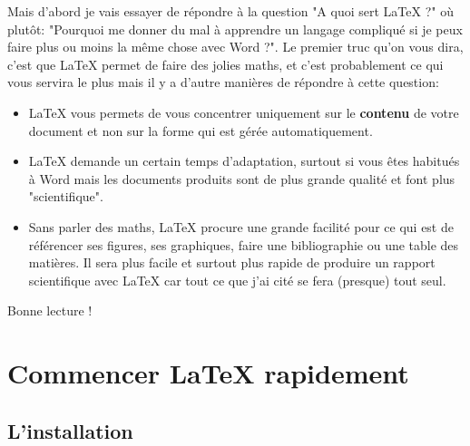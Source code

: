 \documentclass[11pt]{article}				%
\begin{document}
Mais d'abord je vais essayer de répondre à la question "A quoi sert {\LaTeX} ?" où plutôt: "Pourquoi me donner du mal à apprendre un langage compliqué si je peux faire plus ou moins la même chose avec Word ?". Le premier truc qu'on vous dira, c'est que LaTeX permet de faire des jolies maths, et c'est probablement ce qui vous servira le plus mais il y a d'autre manières de répondre à cette question:
\begin{itemize}
	\item LaTeX vous permets de vous concentrer uniquement sur le \textbf{contenu} de votre document et non sur la forme qui est gérée automatiquement.
	\item LaTeX demande un certain temps d'adaptation, surtout si vous êtes habitués à Word mais les documents produits sont de plus grande qualité et font plus "scientifique".
	\item Sans parler des maths, LaTeX procure une grande facilité pour ce qui est de référencer ses figures, ses graphiques, faire une bibliographie ou une table des matières. Il sera plus facile et surtout plus rapide de produire un rapport scientifique avec LaTeX car tout ce que j'ai cité se fera (presque) tout seul.
\end{itemize}  

Bonne lecture !
    
\clearpage

\tableofcontents



\newpage


\section{Commencer {\LaTeX} rapidement}

\subsection{L'installation}
\end{document}
